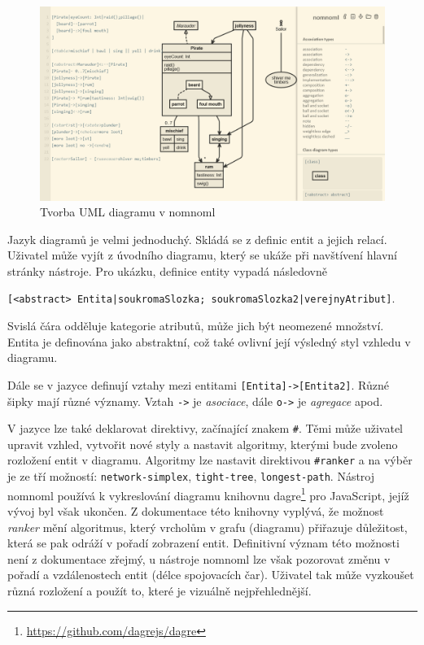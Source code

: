 \begin{figure}[!htb]
  \centering
  \includegraphics[width = \maxwidth{\textwidth}]{../img/nomnoml.png}
  \caption{Tvorba UML diagramu v nomnoml}
  \label{fig:nomnoml}
\end{figure}

Jazyk diagramů je velmi jednoduchý.
Skládá se z definic entit a jejich relací.
Uživatel může vyjít z úvodního diagramu, který se ukáže při navštívení hlavní stránky nástroje.
Pro ukázku, definice entity vypadá následovně

\noindent\texttt{[<abstract> Entita|soukromaSlozka; soukromaSlozka2|verejnyAtribut]}.

Svislá čára odděluje kategorie atributů, může jich být neomezené množství.
Entita je definována jako abstraktní, což také ovlivní její výsledný styl vzhledu v diagramu.

Dále se v jazyce definují vztahy mezi entitami \texttt{[Entita]->[Entita2]}.
Různé šipky mají různé významy.
Vztah \texttt{->} je \emph{asociace}, dále \texttt{o->} je \emph{agregace} apod.

V jazyce lze také deklarovat direktivy, začínající znakem \texttt{\#}.
Těmi může uživatel upravit vzhled, vytvořit nové styly a nastavit algoritmy, kterými bude zvoleno rozložení entit v diagramu.
Algoritmy lze nastavit direktivou \texttt{\#ranker} a na výběr je ze tří možností: \texttt{network-simplex}, \texttt{tight-tree}, \texttt{longest-path}.
Nástroj nomnoml používá k vykreslování diagramu knihovnu dagre\footnote{\url{https://github.com/dagrejs/dagre}} pro JavaScript, jejíž vývoj byl však ukončen.
Z dokumentace této knihovny vyplývá, že možnost \emph{ranker} mění algoritmus, který vrcholům v grafu (diagramu) přiřazuje důležitost, která se pak odráží v pořadí zobrazení entit.
Definitivní význam této možnosti není z dokumentace zřejmý, u nástroje nomnoml lze však pozorovat změnu v pořadí a vzdálenostech entit (délce spojovacích čar).
Uživatel tak může vyzkoušet různá rozložení a použít to, které je vizuálně nejpřehlednější.

